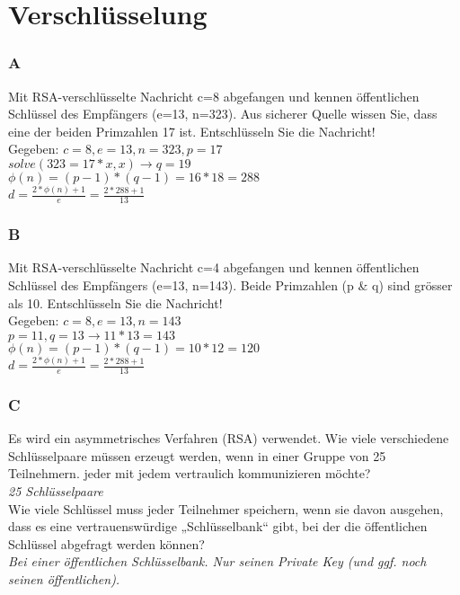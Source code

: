 

\section{Verschlüsselung}
\subsubsection{A}
Mit RSA-verschlüsselte Nachricht c=8 abgefangen und kennen öffentlichen Schlüssel des Empfängers (e=13, n=323).
Aus sicherer Quelle wissen Sie, dass eine der beiden Primzahlen 17 ist. Entschlüsseln Sie die Nachricht!\\
Gegeben: $c=8, e=13, n=323, p=17$\\
$solve(323=17*x,x) \rightarrow q=19$\\
$\phi(n) = (p-1)*(q-1) = 16*18=288$\\
$d=\frac{2*\phi(n)+1}{e}=\frac{2*288+1}{13}$

\subsubsection{B}
Mit RSA-verschlüsselte Nachricht c=4 abgefangen und kennen öffentlichen Schlüssel des Empfängers (e=13, n=143).
Beide Primzahlen (p \& q) sind grösser als 10. Entschlüsseln Sie die Nachricht!\\
Gegeben: $c=8, e=13, n=143$\\
$p=11, q=13 \rightarrow 11*13 = 143$\\
$\phi(n) = (p-1)*(q-1) = 10*12=120$\\
$d=\frac{2*\phi(n)+1}{e}=\frac{2*288+1}{13}$

\subsubsection{C}
Es wird ein asymmetrisches Verfahren (RSA) verwendet. Wie viele verschiedene Schlüsselpaare müssen erzeugt werden, wenn in einer Gruppe von 25 Teilnehmern. jeder mit jedem vertraulich kommunizieren möchte?\\
\textit{25 Schlüsselpaare}\\

Wie viele Schlüssel muss jeder Teilnehmer speichern, wenn sie davon ausgehen, dass es eine vertrauenswürdige „Schlüsselbank“ gibt, bei der die öffentlichen Schlüssel abgefragt werden können?\\
\textit{Bei einer öffentlichen Schlüsselbank. Nur seinen Private Key (und ggf. noch seinen öffentlichen).}\\

